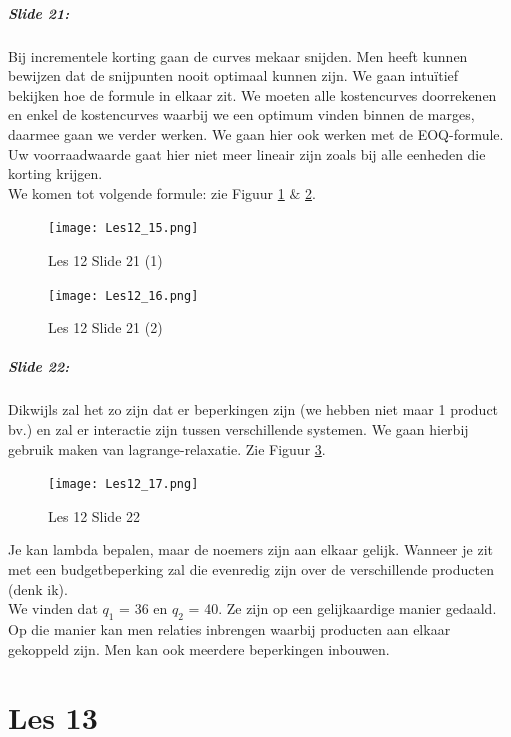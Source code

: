 \documentclass[10pt,a4paper]{report}
\begin{document}
\paragraph{Slide 21:} Bij incrementele korting gaan de curves mekaar snijden. Men heeft kunnen bewijzen dat de snijpunten nooit optimaal kunnen zijn. We gaan intu\"itief bekijken hoe de formule in elkaar zit.
We moeten alle kostencurves doorrekenen en enkel de kostencurves waarbij we een optimum vinden binnen de marges, daarmee gaan we verder werken. We gaan hier ook werken met de EOQ-formule.\\
Uw voorraadwaarde gaat hier niet meer lineair zijn zoals bij alle eenheden die korting krijgen.\\
We komen tot volgende formule: zie Figuur \ref{les12_15} $\&$ \ref{les12_16}.

\begin{figure}[h!]
\centering
\texttt{[image: Les12\_15.png]}
\caption{Les 12 Slide 21 (1)} 
\label{les12_15}
\end{figure}

\begin{figure}[h!]
\centering
\texttt{[image: Les12\_16.png]}
\caption{Les 12 Slide 21 (2)} 
\label{les12_16}
\end{figure}

\paragraph{Slide 22:} Dikwijls zal het zo zijn dat er beperkingen zijn (we hebben niet maar 1 product bv.) en zal er interactie zijn tussen verschillende systemen. We gaan hierbij gebruik maken van lagrange-relaxatie. Zie Figuur \ref{les12_17}.

\begin{figure}[h!]
\centering
\texttt{[image: Les12\_17.png]}
\caption{Les 12 Slide 22} 
\label{les12_17}
\end{figure}

Je kan lambda bepalen, maar de noemers zijn aan elkaar gelijk. Wanneer je zit met een budgetbeperking zal die evenredig zijn over de verschillende producten (denk ik).\\
We vinden dat $q_{1}$ = 36 en $q_{2}$ = 40. Ze zijn op een gelijkaardige manier gedaald. \\
Op die manier kan men relaties inbrengen waarbij producten aan elkaar gekoppeld zijn. Men kan ook meerdere beperkingen inbouwen.

\chapter{Les 13}
\end{document}
